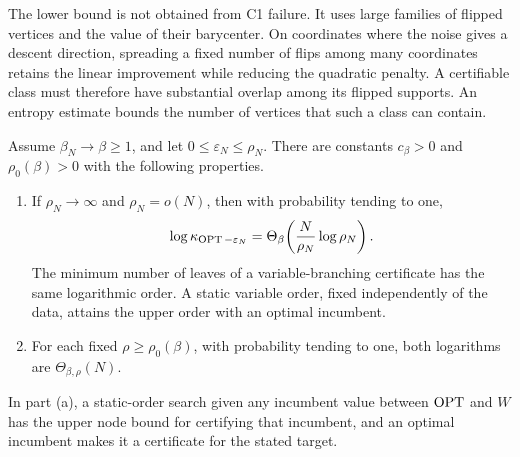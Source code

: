The lower bound is not obtained from C1 failure.  It uses large families
of flipped vertices and the value of their barycenter.  On coordinates
where the noise gives a descent direction, spreading a fixed number of
flips among many coordinates retains the linear improvement while
reducing the quadratic penalty.  A certifiable class must therefore have
substantial overlap among its flipped supports.  An entropy estimate
bounds the number of vertices that such a class can contain.

\begin{theorem}
\label{bls:certificate-law}
Assume $\beta_N\to\beta\ge1$, and let
$0\le\varepsilon_N\le\rho_N$.  There are constants
$c_\beta>0$ and $\rho_0(\beta)>0$ with the following properties.
\begin{enumerate}[label=(\alph*)]
\item If $\rho_N\to\infty$ and $\rho_N=o(N)$, then with probability
tending to one,
\begin{equation}
 \log\kappa_{\operatorname{OPT}-\varepsilon_N}
 =\Theta_\beta\!\left(\frac N{\rho_N}\log\rho_N\right).
 \label{bls:sublinear-certificate-law}
\end{equation}
The minimum number of leaves of a variable-branching certificate has the
same logarithmic order.  A static variable order, fixed independently of
the data, attains the upper order with an optimal incumbent.
\item For each fixed $\rho\ge\rho_0(\beta)$, with probability tending to
one, both logarithms are $\Theta_{\beta,\rho}(N)$.
\end{enumerate}
In part (a), a static-order search given any incumbent value between
$\operatorname{OPT}$ and $W$ has the upper node bound for certifying that incumbent,
and an optimal incumbent makes it a certificate for the stated target.
\end{theorem}


